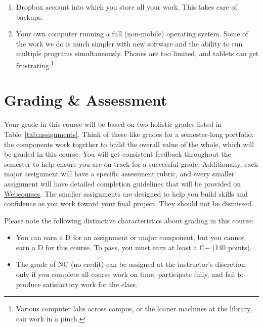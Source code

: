 \documentclass[11pt, twosides]{amsart}	%
\begin{document}
\begin{itemize}
\begin{enumerate}
		\item Dropbox account into which you store all your work. This takes care of backups.
		\item Your own computer running a full (non-mobile) operating system. Some of the work we do is much simpler with new software and the ability to run multiple programs simultaneously. Phones are too limited, and tablets can get frustrating.\footnote{Various computer labs across campus, or the loaner machines at the library, can work in a pinch.}
	\end{enumerate}
\end{itemize}

\section{Grading \& Assessment}
Your grade in this course will be based on two holistic grades listed in Table~\ref{tab:assignments}. Think of these like grades for a semester-long portfolio: the components work together to build the overall value of the whole, which will be graded in this course. You will get consistent feedback throughout the semester to help ensure you are on-track for a successful grade. Additionally, each major assignment will have a specific assessment rubric, and every smaller assignment will have detailed completion guidelines that will be provided  on \href{https://webcourses2c.instructure.com/courses/985581}{Webcourses}.  The smaller assignments are designed to help you build skills and confidence as you work toward your final project. They should not be dismissed.

Please note the following distinctive characteristics about grading in this course:
\begin{itemize}
	\item You can earn a D for an assignment or major component, but you cannot earn a D for this course. To pass, you must earn at least a C− (140 points).
	\item The grade of NC (no credit) can be assigned at the instructor’s discretion only if you complete all course work on time, participate fully, and fail to produce satisfactory work for the class.
\end{itemize}
\end{document}
